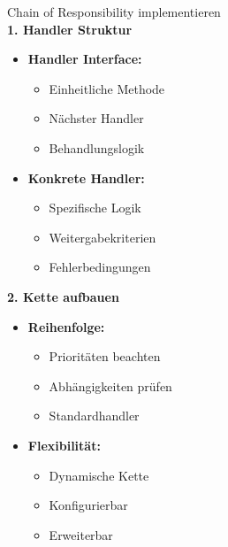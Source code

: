 \begin{KR}{Chain of Responsibility implementieren}\\
\textbf{1. Handler Struktur}
\begin{itemize}
    \item \textbf{Handler Interface:}
    \begin{itemize}
        \item Einheitliche Methode
        \item Nächster Handler
        \item Behandlungslogik
    \end{itemize}
    
    \item \textbf{Konkrete Handler:}
    \begin{itemize}
        \item Spezifische Logik
        \item Weitergabekriterien
        \item Fehlerbedingungen
    \end{itemize}
\end{itemize}

\textbf{2. Kette aufbauen}
\begin{itemize}
    \item \textbf{Reihenfolge:}
    \begin{itemize}
        \item Prioritäten beachten
        \item Abhängigkeiten prüfen
        \item Standardhandler
    \end{itemize}
    
    \item \textbf{Flexibilität:}
    \begin{itemize}
        \item Dynamische Kette
        \item Konfigurierbar
        \item Erweiterbar
    \end{itemize}
\end{itemize}
\end{KR}

